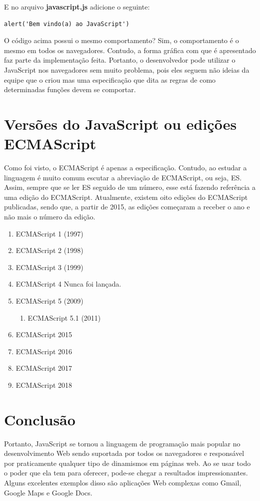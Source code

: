 E no arquivo \textbf{javascript.js} adicione o seguinte:

\begin{lstlisting}
alert('Bem vindo(a) ao JavaScript')
\end{lstlisting}

O código acima possui o mesmo comportamento? Sim, o comportamento é o mesmo em todos os navegadores. Contudo, a forma gráfica com que é apresentado faz parte da implementação feita. Portanto, o desenvolvedor pode utilizar o JavaScript nos navegadores sem muito problema, pois eles seguem não ideias da equipe que o criou mas uma especificação que dita as regras de como determinadas funções devem se comportar.

\section{Versões do JavaScript ou edições ECMAScript}

Como foi visto, o ECMAScript é apenas a especificação. Contudo, ao estudar a 
linguagem é muito comum escutar a abreviação de ECMAScript, ou seja, ES. Assim, sempre que se ler ES seguido de um número, esse está fazendo referência a uma edição do ECMAScript. Atualmente, existem oito edições do ECMAScript publicadas, sendo que, a partir de 2015, as edições começaram a receber o ano e não mais o número da edição.

\begin{enumerate}
  \item ECMAScript 1 (1997)	
  \item ECMAScript 2 (1998)	
  \item ECMAScript 3 (1999)	
  \item ECMAScript 4	Nunca foi lançada.
  \item ECMAScript 5 (2009)
    \begin{enumerate}[label*=\arabic*.]
    \item ECMAScript 5.1 (2011)
    \end{enumerate}
  \item ECMAScript 2015
  \item ECMAScript 2016
  \item ECMAScript 2017
  \item ECMAScript 2018
\end{enumerate} 

\section{Conclusão}
Portanto, JavaScript se tornou a linguagem de programação mais popular no 
desenvolvimento Web sendo suportada por todos os navegadores e responsável por praticamente qualquer tipo de dinamismos em páginas web. Ao se usar todo o poder que ela tem para oferecer, pode-se chegar a resultados impressionantes. Alguns excelentes exemplos disso são aplicações Web complexas como Gmail, Google Maps e Google Docs. 
